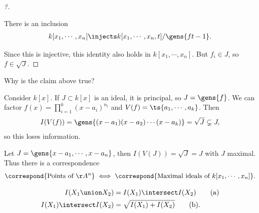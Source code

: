 \begin{proof}[?]
\begin{claim}

There is an inclusion
\begin{align*}  
k[x_1, \cdots, x_n] \injects
k[x_1, \cdots, x_n, t]/\gens{ft-1}
.\end{align*}

\end{claim}

Since this is injective, this identity also holds in
\(k[x_1, \cdots, x_n]\). But \(f_i\in J\), so \(f\in \sqrt{J}\).

\end{proof}

\begin{exercise}[?]

Why is the claim above true?

\end{exercise}

\begin{example}

Consider \(k[x]\). If \(J\subset k[x]\) is an ideal, it is principal, so
\(J = \gens{f}\). We can factor \(f(x) = \prod_{i=1}^k (x-a_i)^{n_i}\)
and \(V(f) = \ts{a_1, \cdots, a_k}\). Then
\begin{align*}
I(V(f)) = \gens{(x-a_1)(x-a_2)\cdots(x-a_k)} = \sqrt{J} \subsetneq J
,\end{align*} so this loses information.

\end{example}

\begin{example}

Let \(J = \gens{x-a_1, \cdots, x-a_n}\), then \(I(V(J)) = \sqrt{J} = J\)
with \(J\) maximal. Thus there is a correspondence
\begin{align*}  
\correspond{\text{Points of } \AA^n} \iff 
\correspond{\text{Maximal ideals of }k[x_1, \cdots, x_n]}
.\end{align*}

\end{example}

\begin{theorem}[Properties of $I$]

\envlist

\begin{align*}  
I(X_1 \union X_2)       &= I(X_1) \intersect I(X_2) \tag{a} \\
I(X_1) \intersect I(X_2) &= \sqrt{I(X_1) + I(X_2)} \tag{b}
.\end{align*}

\end{theorem}

